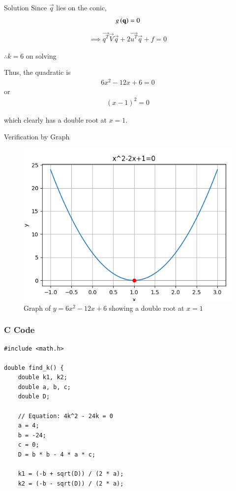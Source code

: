 \documentclass{beamer}
\begin{document}
\begin{frame}{Solution}
Since $\vec{q}$ lies on the conic, 
\begin{align}
g\left(\mathbf{\mathbf{q}}\right) = 0
\end{align}
\begin{align}
\implies \vec{q^T}\vec{V}\vec{q} + 2\vec{u^T}\vec{q} + f = 0
\end{align}

$\therefore k=6$ on solving

Thus, the quadratic is
\begin{align}
6x^2 - 12x + 6 = 0
\end{align}
or
\begin{align}
(x - 1)^2 = 0
\end{align}

which clearly has a double root at $x=1$.
\end{frame}

\begin{frame}{Verification by Graph}
\begin{figure}[ht!]
\centering
\includegraphics[height=0.6\textheight, keepaspectratio]{figs/parabola.png}
\caption{Graph of $y = 6x^2 - 12x + 6$ showing a double root at $x=1$}
\end{figure}
\end{frame}

\begin{frame}[fragile]
    \frametitle{C Code}
\begin{lstlisting}
#include <math.h>

double find_k() {
    double k1, k2;     
    double a, b, c;    
    double D;          

    // Equation: 4k^2 - 24k = 0
    a = 4;
    b = -24;
    c = 0;
    D = b * b - 4 * a * c;

    k1 = (-b + sqrt(D)) / (2 * a);
    k2 = (-b - sqrt(D)) / (2 * a);

\end{lstlisting}
\end{frame}
\end{document}
